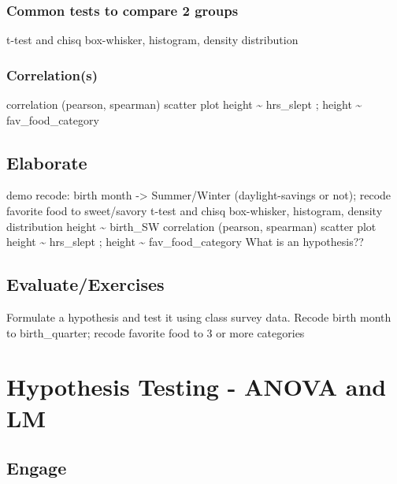 \documentclass[
]{book}
\begin{document}
\hypertarget{common-tests-to-compare-2-groups}{%
\subsection{Common tests to compare 2 groups}\label{common-tests-to-compare-2-groups}}

t-test and chisq \textbar{} box-whisker, histogram, density distribution

\hypertarget{correlations}{%
\subsection{Correlation(s)}\label{correlations}}

correlation (pearson, spearman) \textbar{} scatter plot
height \textasciitilde{} hrs\_slept ; height \textasciitilde{} fav\_food\_category

\hypertarget{elaborate-3}{%
\section{Elaborate}\label{elaborate-3}}

demo recode: birth month -\textgreater{} Summer/Winter (daylight-savings or not); recode favorite food to sweet/savory
t-test and chisq \textbar{} box-whisker, histogram, density distribution
height \textasciitilde{} birth\_SW
correlation (pearson, spearman) \textbar{} scatter plot
height \textasciitilde{} hrs\_slept ; height \textasciitilde{} fav\_food\_category
What is an hypothesis??

\hypertarget{evaluateexercises-3}{%
\section{Evaluate/Exercises}\label{evaluateexercises-3}}

Formulate a hypothesis and test it using class survey data.
Recode birth month to birth\_quarter; recode favorite food to 3 or more categories

\hypertarget{hypothesis-testing---anova-and-lm}{%
\chapter{Hypothesis Testing - ANOVA and LM}\label{hypothesis-testing---anova-and-lm}}

\hypertarget{engage-4}{%
\section{Engage}\label{engage-4}}
\end{document}
